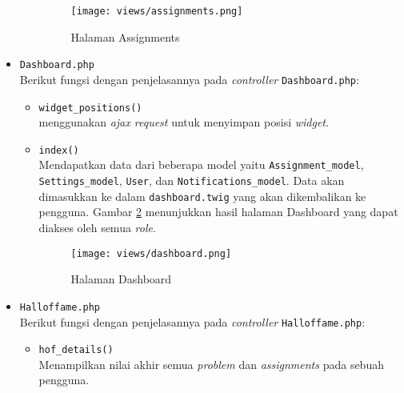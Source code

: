 \begin{itemize}
\begin{itemize}
		            \vspace{0.5cm}

		            \begin{figure}[H]
			            \centering
			            \texttt{[image: views/assignments.png]}
			            \caption{Halaman Assignments}
			            \label{fig:3:1:1:assignments}
		            \end{figure}
	      \end{itemize}

	      \newpage

	\item \verb|Dashboard.php| \\
	      Berikut fungsi dengan penjelasannya pada \textit{controller} \verb|Dashboard.php|:

	      \begin{itemize}
		      \item \verb|widget_positions()| \\
		            menggunakan \textit{ajax request} untuk menyimpan posisi \textit{widget}.

		      \item \verb|index()| \\
		            Mendapatkan data dari beberapa model yaitu \verb|Assignment_model|, \verb|Settings_model|, \verb|User|, dan \verb|Notifications_model|. Data akan dimasukkan ke dalam \verb|dashboard.twig| yang akan dikembalikan ke pengguna. Gambar \ref{fig:3:1:1:dashboard} menunjukkan hasil halaman Dashboard yang dapat diakses oleh semua \textit{role}.

		            \begin{figure}[H]
			            \centering
			            \texttt{[image: views/dashboard.png]}
			            \caption{Halaman Dashboard}
			            \label{fig:3:1:1:dashboard}
		            \end{figure}

	      \end{itemize}

	\item \verb|Halloffame.php| \\
	      Berikut fungsi dengan penjelasannya pada \textit{controller} \verb|Halloffame.php|:

	      \begin{itemize}
		      \item \verb|hof_details()| \\
		            Menampilkan nilai akhir semua \textit{problem} dan \textit{assignments} pada sebuah pengguna.


\end{itemize}
\end{itemize}
